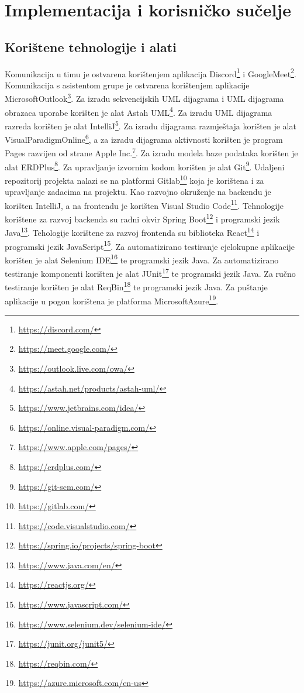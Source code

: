 \chapter{Implementacija i korisničko sučelje}
		
		
		\section{Korištene tehnologije i alati}
			{
				Komunikacija u timu je ostvarena korištenjem aplikacija Discord\footnote{\url{https://discord.com/}} i GoogleMeet\footnote{\url{https://meet.google.com/}}.
				Komunikacija s asistentom grupe je ostvarena korištenjem aplikacije MicrosoftOutlook\footnote{\url{https://outlook.live.com/owa/}}.
				Za izradu sekvencijskih UML dijagrama i UML dijagrama obrazaca uporabe korišten je alat Astah UML\footnote{\url{https://astah.net/products/astah-uml/}}. Za izradu UML dijagrama razreda korišten je alat IntelliJ\footnote{\url{https://www.jetbrains.com/idea/}}. Za izradu dijagrama razmještaja korišten je alat VisualParadigmOnline\footnote{\url{https://online.visual-paradigm.com/}}, a za izradu dijagrama aktivnosti korišten je program Pages razvijen od strane Apple Inc.\footnote{\url{https://www.apple.com/pages/}}.
				Za izradu modela baze podataka korišten je alat ERDPlus\footnote{\url{https://erdplus.com/}}.
				Za upravljanje izvornim kodom korišten je alat Git\footnote{\url{https://git-scm.com/}}. Udaljeni repozitorij projekta nalazi se na platformi Gitlab\footnote{\url{https://gitlab.com/}} koja je korištena i za upravljanje zadacima na projektu.
				Kao razvojno okruženje na backendu je korišten IntelliJ, a na frontendu je korišten Visual Studio Code\footnote{\url{https://code.visualstudio.com/}}. Tehnologije korištene za razvoj backenda su radni okvir Spring Boot\footnote{\url{https://spring.io/projects/spring-boot}} i programski jezik Java\footnote{\url{https://www.java.com/en/}}. Tehologije korištene za razvoj frontenda su biblioteka React\footnote{\url{https://reactjs.org/}} i programski jezik JavaScript\footnote{\url{https://www.javascript.com/}}.
				\eject
				Za automatizirano testiranje cjelokupne aplikacije korišten je alat Selenium IDE\footnote{\url{https://www.selenium.dev/selenium-ide/}} te programski jezik Java. 
				Za automatizirano testiranje komponenti korišten je alat JUnit\footnote{\url{https://junit.org/junit5/}} te programski jezik Java.
				Za ručno testiranje korišten je alat ReqBin\footnote{\url{https://reqbin.com/}} te programski jezik Java.
				Za puštanje aplikacije u pogon korištena je platforma MicrosoftAzure\footnote{\url{https://azure.microsoft.com/en-us}}.
		    }
			
